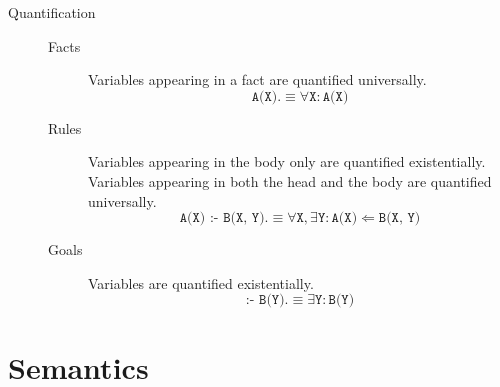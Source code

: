 \begin{description}
        \begin{description}
            \item[Quantification]  \phantom{}
                \begin{description}
                    \item[Facts] 
                        Variables appearing in a fact are quantified universally.
                        \[ \texttt{A(X).} \equiv \forall \texttt{X}: \texttt{A(X)}  \]
                    \item[Rules] 
                        Variables appearing in the body only are quantified existentially.
                        Variables appearing in both the head and the body are quantified universally.
                        \[ \texttt{A(X) :- B(X, Y).} \equiv \forall \texttt{X}, \exists \texttt{Y} : \texttt{A(X)} \Leftarrow \texttt{B(X, Y)} \]

                    \item[Goals] 
                        Variables are quantified existentially.
                        \[ \texttt{:- B(Y).} \equiv \exists \texttt{Y} : \texttt{B(Y)}  \]
                \end{description}
        \end{description}
\end{description}


\section{Semantics}

